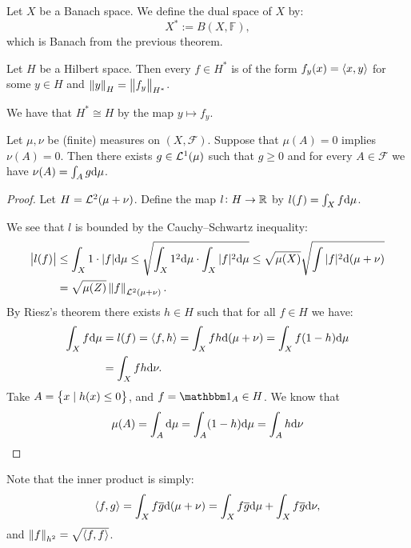 \documentclass[11pt,a4paper]{article}
\begin{document}
\begin{definition}
  Let $X$ be a Banach space.
  We define the dual space of $X$ by:
  \[
    X^* := B(X,\mathbb F),
  \]
  which is Banach from the previous theorem.
\end{definition}

\begin{theorem}
  Let $H$ be a Hilbert space.
  Then every $f \in H^*$ is of the form $f_y(x) = \left\langle x, y \right\rangle$
  for some $y \in H$ and $\left\lVert y\right\rVert_{H} = \left\lVert f_y\right\rVert_{H^*}$.
\end{theorem}

\begin{remark}
  We have that $H^* \cong H$ by the map $y \mapsto f_y$.
\end{remark}

\begin{corollary}
  Let $\mu,\nu$ be (finite) measures on $(X,\mathcal F)$.
  Suppose that $\mu(A) = 0$ implies $\nu(A) = 0$.
  Then there exists $g \in \mathcal{L}^1(\mu)$ such that $g \geq 0$
  and for every $A \in \mathcal F$ we have $\nu(A) = \int_{A} g \mathrm{d} \mu$.
\end{corollary}
\begin{proof}
  Let $H = \mathcal{L}^2(\mu + \nu)$.
  Define the map $l \colon H \to \mathbb{R}$ by $l(f) = \int_X f \mathrm{d} \mu$.

  We see that $l$ is bounded by the Cauchy--Schwartz inequality:
  \begin{align*}
    \left\lvert l(f)\right\rvert &\le
    \int_X 1 \cdot |f| \mathrm{d} \mu \le
    \sqrt{\int_X 1^2 \mathrm{d} \mu \cdot \int_X |f|^2 \mathrm{d} \mu} \le
    \sqrt{\mu(X)} \sqrt{\int |f|^2 \mathrm{d}(\mu + \nu)} \\ &=
    \sqrt{\mu(Z)} \left\lVert f\right\rVert_{\mathcal{L}^2(\mu + \nu)}.
  \end{align*}
  By Riesz's theorem there exists $h \in H$ such that
  for all $f \in H$ we have:
  \begin{align*}
    \int_X f \mathrm{d} \mu &=
    l(f) =
    \left\langle f, h \right\rangle =
    \int_X f h \mathrm{d}(\mu + \nu) =
    \int_X f (1 - h) \mathrm{d} \mu \\ &= \int_X f h \mathrm{d} \nu.
  \end{align*}
  Take $A = \left\{x \mid h(x) \le 0\right\}$,
  and $f = \ind_A \in H$.
  We know that
  \[
    \mu(A) =
    \int_A \mathrm{d} \mu =
    \int_A (1 - h) \mathrm{d} \mu =
    \int_A h \mathrm{d} \nu 
  \]
\end{proof}

\begin{remark}
  Note that the inner product is simply:
  \begin{align*}
    \left\langle f, g \right\rangle = \int_X f \overline g \mathrm{d}(\mu + \nu) =
    \int_X f \overline g \mathrm{d} \mu + \int_X f \overline g \mathrm{d} \nu,
  \end{align*}
  and $\left\lVert f\right\rVert_{h^2} = \sqrt{\left\langle f, f \right\rangle}$.
\end{remark}
\end{document}
